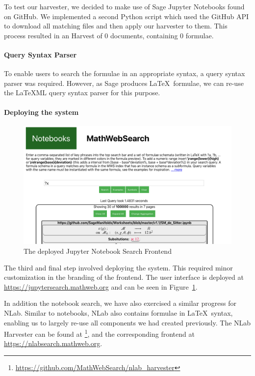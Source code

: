 To test our harvester, we decided to make use of Sage Jupyter Notebooks found on GitHub. 
We implemented a second Python script which used the GitHub API to download all matching files and then apply our harvester to them. 
This process resulted in an \MWS Harvest of $0$ documents, containing $0$ formulae.

\paragraph{Query Syntax Parser}

To enable users to search the formulae in an appropriate syntax, a query syntax parser was required. 
However, as Sage produces \LaTeX\ formulae, we can re-use the {\LaTeX}ML query syntax parser for this purpose. 

\paragraph{Deploying the system}

\begin{figure}[ht]
  \includegraphics[width=\textwidth]{mwsnotebookfront.png}
  \caption{The deployed Jupyter Notebook Search Frontend}\label{fig:mwsnotebookfront}
\end{figure}

The third and final step involved deploying the system.
This required minor customization in the branding of the frontend. 
The user interface is deployed at \url{https://jupytersearch.mathweb.org} and can be seen in Figure~\ref{fig:mwsnotebookfront}.

In addition the notebook search, we have also exercised a similar progress for NLab. 
Similar to notebooks, NLab also contains formulae in \LaTeX\ syntax, enabling us to largely re-use all components we had created previously.
The NLab Harvester can be found at \footnote{\url{https://github.com/MathWebSearch/nlab_harvester}}, and the corresponding frontend at \url{https://nlabsearch.mathweb.org}. 

